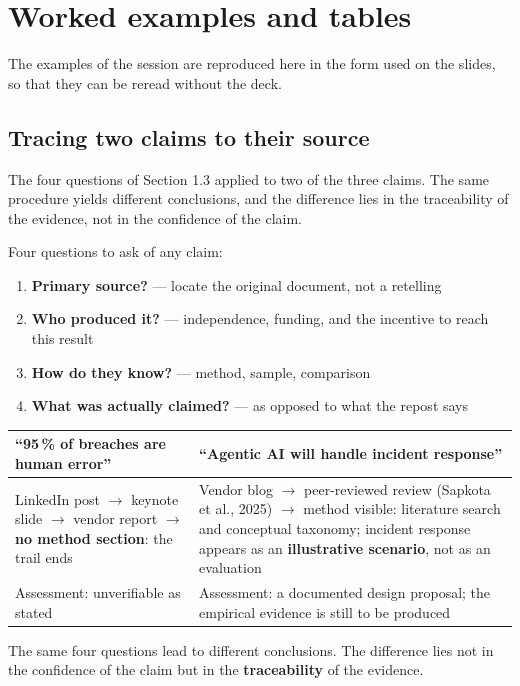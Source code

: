 \documentclass[11pt,a4paper,british,twoside=false,headings=small,chapterprefix=false,numbers=noenddot]{scrbook}
\begin{document}
\section{Worked examples and tables}

The examples of the session are reproduced here in the form used on the slides, so that they can be reread without the deck.

\subsection{Tracing two claims to their source}
The four questions of Section 1.3 applied to two of the three claims. The same procedure yields different conclusions, and the difference lies in the traceability of the evidence, not in the confidence of the claim.
\begin{center}\small
Four questions to ask of any claim:
  \begin{enumerate}\setlength{\itemsep}{0.15em}
    \item \textbf{Primary source?} --- locate the original document, not a retelling
    \item \textbf{Who produced it?} --- independence, funding, and the incentive to reach this result
    \item \textbf{How do they know?} --- method, sample, comparison
    \item \textbf{What was actually claimed?} --- as opposed to what the repost says
  \end{enumerate}
  
  \footnotesize
  \renewcommand{\arraystretch}{1.3}
  \begin{tabular}{@{}p{6.3cm}p{6.5cm}@{}}
    \toprule
    \textbf{``95\,\% of breaches are human error''} & \textbf{``Agentic AI will handle incident response''}\\
    \midrule
    LinkedIn post $\rightarrow$ keynote slide $\rightarrow$ vendor report $\rightarrow$ \textbf{no method section}: the trail ends & Vendor blog $\rightarrow$ peer-reviewed review (Sapkota et al., 2025) $\rightarrow$ method visible: literature search and conceptual taxonomy; incident response appears as an \textbf{illustrative scenario}, not as an evaluation\\
    Assessment: unverifiable as stated & Assessment: a documented design proposal; the empirical evidence is still to be produced\\
    \bottomrule
  \end{tabular}
  

  {\color{uiagrey}\small The same four questions lead to different
  conclusions. The difference lies not in the confidence of the claim but in
  the \textbf{traceability} of the evidence.}
\end{center}
\end{document}
